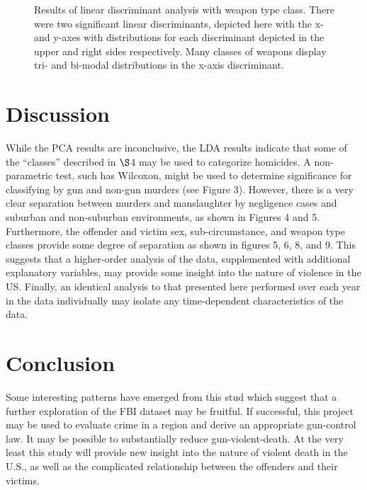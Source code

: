 \begin{figure}[H]
  \caption{Results of linear discriminant analysis with weapon type class.  There were two significant linear discriminants, depicted here with the x- and y-axes with distributions for each discriminant depicted in the upper and right sides respectively.  Many classes of weapons display tri- and bi-modal distributions in the x-axis discriminant.}

\end{figure}

\newpage


\begin{multicols}{2}

\section{Discussion}

While the PCA results are inconclusive, the LDA results indicate that some of the ``classes'' described in $\S$4 may be used to categorize homicides.  A non-parametric test, such has Wilcoxon, might be used to determine significance for classifying by gun and non-gun murders (see Figure 3).  However, there is a very clear separation between murders and manslaughter by negligence cases and suburban and non-suburban environments, as shown in Figures 4 and 5.  Furthermore, the offender and victim sex, sub-circumstance, and weapon type classes provide some degree of separation as shown in figures 5, 6, 8, and 9.  This suggests that a higher-order analysis of the data, supplemented with additional explanatory variables, may provide some insight into the nature of violence in the US.  Finally, an identical analysis to that presented here performed over each year in the data individually may isolate any time-dependent characteristics of the data.

\section{Conclusion}

Some interesting patterns have emerged from this stud which suggest that a further exploration of the FBI dataset may be fruitful.  If successful, this project may be used to evaluate crime in a region and derive an appropriate gun-control law.  It may be possible to substantially reduce gun-violent-death.  At the very least this study will provide new insight into the nature of violent death in the U.S., as well as the complicated relationship between the offenders and their victims.

\printbibliography

\end{multicols}







